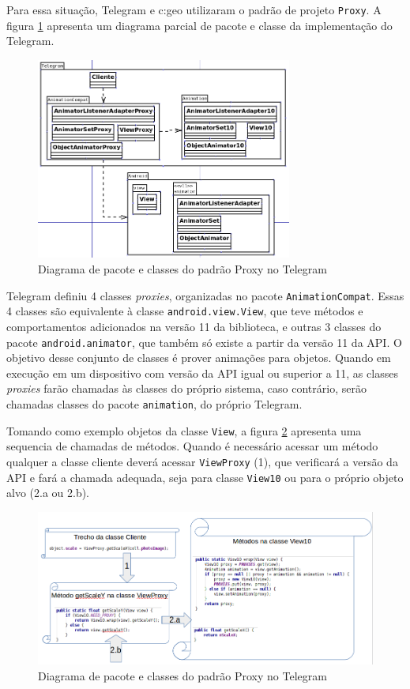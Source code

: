 Para essa situação, Telegram e c:geo utilizaram o padrão de projeto \texttt{Proxy}.
A figura \ref{fig:proxy_package_uml} apresenta um diagrama parcial de pacote e
classe da implementação do Telegram.

\begin{figure}[ht]
\centering
\includegraphics[width=0.75\textwidth]{imagens/proxy_package_uml.png}
\caption{Diagrama de pacote e classes do padrão Proxy no Telegram}
\label{fig:proxy_package_uml}
\end{figure}


Telegram definiu 4 classes \textit{proxies}, organizadas no pacote \texttt{AnimationCompat}.
Essas 4 classes são equivalente à classe \texttt{android.view.View}, que teve
métodos e comportamentos adicionados na versão 11 da biblioteca, e outras 3 classes
do pacote \texttt{android.animator}, que também só existe a partir da versão 11 da API.
O objetivo desse conjunto de classes é prover animações para objetos. Quando em
execução em um dispositivo com versão da API igual ou superior a 11, as classes
\textit{proxies} farão chamadas às classes do próprio sistema, caso contrário,
serão chamadas classes do pacote \texttt{animation}, do próprio Telegram. 

Tomando como exemplo objetos da classe \texttt{View}, a figura \ref{fig:exemplo_view_proxy}
apresenta uma sequencia de chamadas de métodos. Quando é necessário acessar um
método qualquer a classe cliente deverá acessar \texttt{ViewProxy} (1),  que
verificará a versão da API e fará a chamada adequada, seja para classe
\texttt{View10} ou para o próprio objeto alvo (2.a ou 2.b).


\begin{figure}[ht]
\centering
\includegraphics[width=1\textwidth]{imagens/exemplo_view_proxy.png}
\caption{Diagrama de pacote e classes do padrão Proxy no Telegram}
\label{fig:exemplo_view_proxy}
\end{figure}

